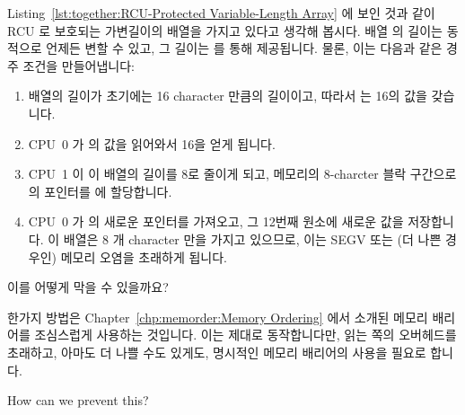 Listing~\ref{lst:together:RCU-Protected Variable-Length Array} 에 보인 것과 같이
RCU 로 보호되는 가변길이의 배열을 가지고 있다고 생각해 봅시다.
배열  의 길이는 동적으로 언제든 변할 수 있고, 그 길이는 
를 통해 제공됩니다.
물론, 이는 다음과 같은 경주 조건을 만들어냅니다:
\iffalse

Suppose we have an RCU-protected variable-length array, as shown in
Listing~\ref{lst:together:RCU-Protected Variable-Length Array}.
The length of the array \co{->a[]} can change dynamically, and at any
given time, its length is given by the field \co{->length}.
Of course, this introduces the following race condition:
\fi

\begin{enumerate}
\item	배열의 길이가 초기에는 16 character 만큼의 길이이고, 따라서
	 는 16의 값을 갖습니다.
\item	CPU~0 가  의 값을 읽어와서 16을 얻게 됩니다.
\item	CPU~1 이 이 배열의 길이를 8로 줄이게 되고, 메모리의 8-charcter 블락
	구간으로의 포인터를  에 할당합니다.
\item	CPU~0 가  의 새로운 포인터를 가져오고, 그 12번째 원소에
	새로운 값을 저장합니다.
	이 배열은 8 개 character 만을 가지고 있으므로, 이는 SEGV 또는 (더 나쁜
	경우인) 메모리 오염을 초래하게 됩니다.
\iffalse

\item	The array is initially 16 characters long, and thus \co{->length}
	is equal to 16.
\item	CPU~0 loads the value of \co{->length}, obtaining the value 16.
\item	CPU~1 shrinks the array to be of length 8, and assigns a pointer
	to a new 8-character block of memory into \co{->a[]}.
\item	CPU~0 picks up the new pointer from \co{->a[]}, and stores a
	new value into element 12.
	Because the array has only 8 characters, this results in
	a SEGV or (worse yet) memory corruption.
\fi
\end{enumerate}

이를 어떻게 막을 수 있을까요?

한가지 방법은
Chapter~\ref{chp:memorder:Memory Ordering} 에서 소개된 메모리 배리어를
조심스럽게 사용하는 것입니다.
이는 제대로 동작합니다만, 읽는 쪽의 오버헤드를 초래하고, 아마도 더 나쁠 수도
있게도, 명시적인 메모리 배리어의 사용을 필요로 합니다.
\iffalse

How can we prevent this?

